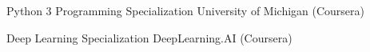 

\begin{cventries}

  \cventry
  {} %
  {Python 3 Programming Specialization} %
  {University of Michigan (Coursera)} %
  {} %
  {}

  \cventry
  {} %
  {Deep Learning Specialization} %
  {DeepLearning.AI (Coursera)} %
  {} %
  {}

\end{cventries}
